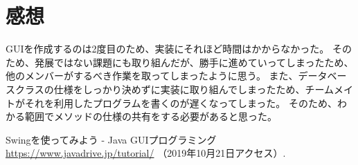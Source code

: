 \documentclass{jarticle}
\begin{document}
\section{感想}
GUIを作成するのは2度目のため、実装にそれほど時間はかからなかった。
そのため、発展ではない課題にも取り組んだが、勝手に進めていってしまったため、他のメンバーがするべき作業を取ってしまったように思う。
また、データベースクラスの仕様をしっかり決めずに実装に取り組んでしまったため、チームメイトがそれを利用したプログラムを書くのが遅くなってしまった。
そのため、わかる範囲でメソッドの仕様の共有をする必要があると思った。


\begin{thebibliography}{99}
 Swingを使ってみよう - Java GUIプログラミング
\url{https://www.javadrive.jp/tutorial/} （2019年10月21日アクセス）.


\end{thebibliography}
\end{document}
